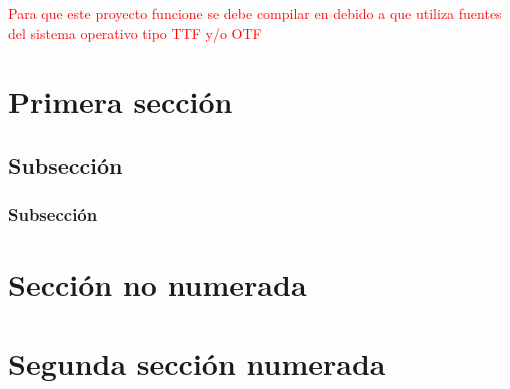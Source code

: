 \textcolor{red}{Para que este proyecto funcione se debe compilar en \XeLaTeX debido a que utiliza fuentes del sistema operativo tipo \gls{TTF} y/o \gls{OTF}}

\section{Primera sección}
\subsection{Subsección}
\subsubsection{Subsección}

\section*{Sección no numerada}
\section{Segunda sección numerada}

